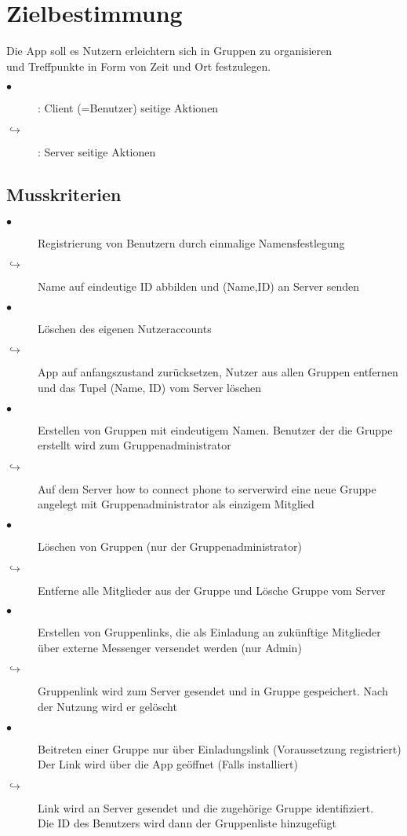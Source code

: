 \documentclass{article}
\begin{document}
\section{Zielbestimmung}
Die App soll es Nutzern erleichtern sich in Gruppen zu organisieren \\
und Treffpunkte in Form von Zeit und Ort festzulegen.
\begin{description}
\item[$\bullet$]: Client (=Benutzer) seitige Aktionen
\item[$\hookrightarrow$]: Server seitige Aktionen
\end{description}
\subsection{Musskriterien}
\begin{description}
\item[$\bullet$] Registrierung von Benutzern durch einmalige Namensfestlegung
\item[$\hookrightarrow$] Name auf eindeutige ID abbilden und (Name,ID) an Server senden
\item[$\bullet$] Löschen des eigenen Nutzeraccounts
\item[$\hookrightarrow$] App auf anfangszustand zurücksetzen, Nutzer aus allen Gruppen entfernen und das Tupel (Name, ID) vom Server löschen
\item[$\bullet$] Erstellen von Gruppen mit eindeutigem Namen. Benutzer der die Gruppe erstellt wird zum Gruppenadministrator
\item[$\hookrightarrow$] Auf dem Server how to connect phone to serverwird eine neue Gruppe angelegt mit Gruppenadministrator als einzigem Mitglied
\item[$\bullet$] Löschen von Gruppen (nur der Gruppenadministrator)
\item[$\hookrightarrow$] Entferne alle Mitglieder aus der Gruppe und Lösche Gruppe vom Server
\item[$\bullet$] Erstellen von Gruppenlinks, die als Einladung an zukünftige Mitglieder über externe Messenger versendet werden (nur Admin)
\item[$\hookrightarrow$] Gruppenlink wird zum Server gesendet und in Gruppe gespeichert. Nach der Nutzung wird er gelöscht
\item[$\bullet$] Beitreten einer Gruppe nur über Einladungslink (Voraussetzung registriert)
     Der Link wird über die App geöffnet (Falls installiert)
\item[$\hookrightarrow$] Link wird an Server gesendet und die zugehörige Gruppe identifiziert.\\ Die ID des Benutzers wird dann der Gruppenliste hinzugefügt

\end{description}
\end{document}
